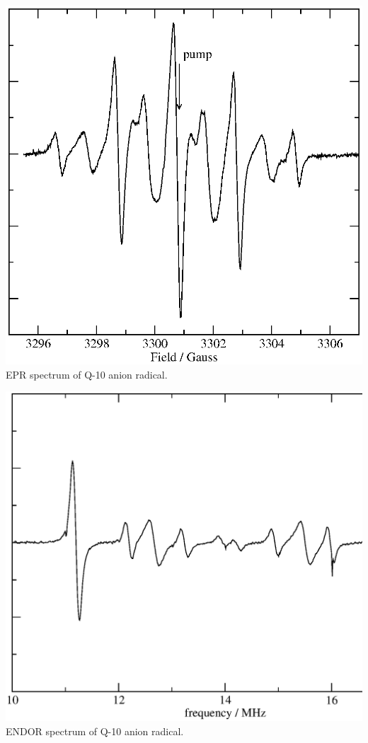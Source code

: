 \documentclass[byrevtex,amssymb,aps,pra,floatfix,letterpaper]{revtex4}
\begin{document}
\begin{center}
\includegraphics*[scale=0.4]{fig19}\\
EPR spectrum of Q-10 anion radical.
\end{center}

\begin{center}
\includegraphics*[scale=0.4]{fig20}\\
ENDOR spectrum of Q-10 anion radical.
\end{center}
\end{document}
